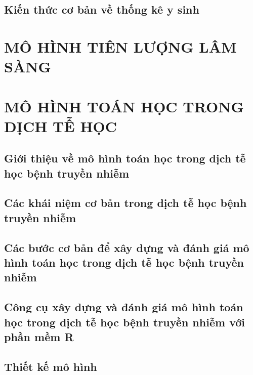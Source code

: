 \documentclass[
]{book}
\begin{document}
\hypertarget{stkcb_thongke}{%
\chapter{Kiến thức cơ bản về thống kê y sinh}\label{stkcb_thongke}}

\hypertarget{part-muxf4-huxecnh-tiuxean-lux1b0ux1ee3ng-luxe2m-suxe0ng}{%
\part{MÔ HÌNH TIÊN LƯỢNG LÂM SÀNG}\label{part-muxf4-huxecnh-tiuxean-lux1b0ux1ee3ng-luxe2m-suxe0ng}}

\hypertarget{part-muxf4-huxecnh-touxe1n-hux1ecdc-trong-dux1ecbch-tux1ec5-hux1ecdc}{%
\part{MÔ HÌNH TOÁN HỌC TRONG DỊCH TỄ HỌC}\label{part-muxf4-huxecnh-touxe1n-hux1ecdc-trong-dux1ecbch-tux1ec5-hux1ecdc}}

\hypertarget{mhth_gioithieu}{%
\chapter{Giới thiệu về mô hình toán học trong dịch tễ học bệnh truyền nhiễm}\label{mhth_gioithieu}}

\hypertarget{mhth_khainiem}{%
\chapter{Các khái niệm cơ bản trong dịch tễ học bệnh truyền nhiễm}\label{mhth_khainiem}}

\hypertarget{mhth_buoc}{%
\chapter{Các bước cơ bản để xây dựng và đánh giá mô hình toán học trong dịch tễ học bệnh truyền nhiễm}\label{mhth_buoc}}

\hypertarget{mhth_congcu}{%
\chapter{Công cụ xây dựng và đánh giá mô hình toán học trong dịch tễ học bệnh truyền nhiễm với phần mềm R}\label{mhth_congcu}}

\hypertarget{mhth_thietke}{%
\chapter{Thiết kế mô hình}\label{mhth_thietke}}
\end{document}
